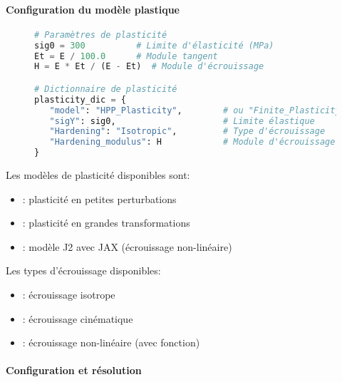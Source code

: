 \documentclass[10pt]{book}
\begin{document}
\paragraph{Configuration du modèle plastique}

\begin{figure}[h!]
\begin{lstlisting}[language=python]
# Paramètres de plasticité
sig0 = 300          # Limite d'élasticité (MPa)
Et = E / 100.0      # Module tangent
H = E * Et / (E - Et)  # Module d'écrouissage

# Dictionnaire de plasticité
plasticity_dic = {
   "model": "HPP_Plasticity",        # ou "Finite_Plasticity"
   "sigY": sig0,                     # Limite élastique
   "Hardening": "Isotropic",         # Type d'écrouissage
   "Hardening_modulus": H            # Module d'écrouissage
}
\end{lstlisting}
\end{figure}

Les modèles de plasticité disponibles sont:
\begin{itemize}
\item {}: plasticité en petites perturbations
\item {}: plasticité en grandes transformations
\item {}: modèle J2 avec JAX (écrouissage non-linéaire)
\end{itemize}

Les types d'écrouissage disponibles:
\begin{itemize}
\item {}: écrouissage isotrope
\item {}: écrouissage cinématique
\item {}: écrouissage non-linéaire (avec fonction)
\end{itemize}

\paragraph{Configuration et résolution}
\end{document}
